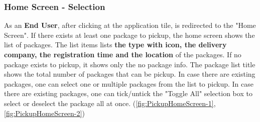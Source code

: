 \subsubsection{Home Screen - Selection}
As an \textbf{End User}, after clicking at the application tile, is redirected to the "Home Screen". If there exists at least one package to pickup, the home screen shows the list of packages. 
The list items lists \textbf{the type with icon, the delivery company, the registration time and the location} of the packages. 
If no package exists to pickup, it shows only the no package info. 
The package list title shows the total number of packages that can be pickup.
In case there are existing packages, one can select one or multiple packages from the list to pickup. 
In case there are existing packages, one can tick/untick the "Toggle All" selection box to select or deselect the package all at once. 
(\autoref{fig:PickupHomeScreen-1}, \autoref{fig:PickupHomeScreen-2})

